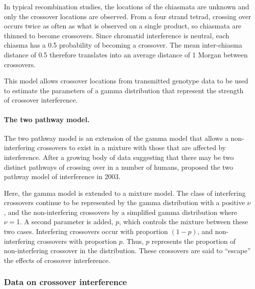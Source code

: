 In typical recombination studies, the locations of the chiasmata are unknown and only the crossover locations are observed.
From a four strand tetrad, crossing over occurs twice as often as what is observed on a single product, so chiasmata are thinned to become crossovers.
Since chromatid interference is neutral, each chiasma has a 0.5 probability of becoming a crossover.
The mean inter-chiasma distance of 0.5 therefore translates into an average distance of 1 Morgan between crossovers.

This model allows crossover locations from transmitted genotype data to be used to estimate the parameters of a gamma distribution that represent the strength of crossover interference.




\paragraph{The two pathway model.}

The two pathway model is an extension of the gamma model that allows a non-interfering crossovers to exist in a mixture with those that are affected by interference.
After a growing body of data suggesting that there may be two distinct pathways of crossing over in a number of humans, \citet{Housworth2003} proposed the two pathway model of interference in 2003.

Here, the gamma model is extended to a mixture model.
The class of interfering crossovers continue to be represented by the gamma distribution with a positive $\nu$, and the non-interfering crossovers by a simplified gamma distribution where $\nu=$1.
A second parameter is added, $p$, which controls the mixture between these two cases.
Interfering crossovers occur with proportion $(1-p)$, and non-interfering crossovers with proportion $p$.
Thus, $p$ represents the proportion of non-interfering crossover in the distribution.
These crossovers are said to ``escape'' the effects of crossover interference.

\subsubsection{Data on crossover interference}


